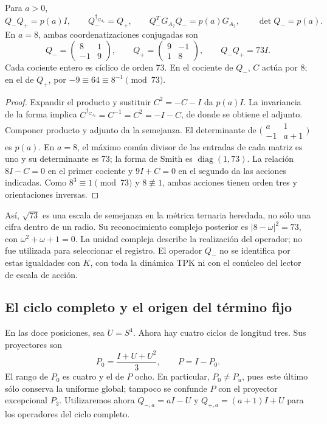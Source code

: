 \begin{proposition}
\label{lib02:norma-A2}
Para \(a>0\),
\[
 Q_-Q_+=p(a)I,\qquad Q_-^{\dagger_{G_{A_2}}}=Q_+,
 \qquad Q_-^TG_{A_2}Q_-=p(a)G_{A_2},\qquad \det Q_-=p(a).
\]
En \(a=8\), ambas coordenatizaciones conjugadas son
\[
 Q_-=
 \begin{pmatrix}8&1\\-1&9\end{pmatrix},\qquad
 Q_+=\begin{pmatrix}9&-1\\1&8\end{pmatrix},\qquad Q_-Q_+=73I.
\]
Cada cociente entero es cíclico de orden 73. En el cociente de \(Q_-\),
\(C\) actúa por \(8\); en el de \(Q_+\), por
\(-9\equiv64\equiv8^{-1}\pmod{73}\).
\end{proposition}
\begin{proof}
Expandir el producto y sustituir \(C^2=-C-I\) da \(p(a)I\).
La invariancia de la forma implica
\(C^{\dagger_{G_{A_2}}}=C^{-1}=C^2=-I-C\), de donde se obtiene
el adjunto. Componer producto y adjunto da la semejanza. El determinante
de \(\bigl(\begin{smallmatrix}a&1\\-1&a+1\end{smallmatrix}\bigr)\)
es \(p(a)\). En \(a=8\), el máximo común divisor de las entradas
de cada matriz es uno y su determinante es 73; la forma de Smith es
\(\operatorname{diag}(1,73)\). La relación \(8I-C=0\) en el
primer cociente y \(9I+C=0\) en el segundo da las acciones indicadas.
Como \(8^3\equiv1\pmod{73}\) y \(8\not\equiv1\), ambas
acciones tienen orden tres y orientaciones inversas.
\end{proof}

Así, \(\sqrt{73}\) es una escala de semejanza en la métrica ternaria
heredada, no sólo una cifra dentro de un radio. Su reconocimiento complejo
posterior es \(|8-\omega|^2=73\), con
\(\omega^2+\omega+1=0\). La unidad compleja describe la realización
del operador; no fue utilizada para seleccionar el registro. El operador
\(Q_-\) no se identifica por estas igualdades con \(K\), con toda
la dinámica TPK ni con el conúcleo del lector de escala de acción.

\subsection{El ciclo completo y el origen del término fijo}
\label{lib02:ciclo-completo}

En las doce posiciones, sea \(U=S^4\). Ahora hay cuatro ciclos de
longitud tres. Sus proyectores son
\[
 P_0=\frac{I+U+U^2}{3},\qquad P=I-P_0.
\]
El rango de \(P_0\) es cuatro y el de \(P\) ocho. En particular,
\(P_0\ne P_u\), pues este último sólo conserva la uniforme global;
tampoco se confunde \(P\) con el proyector excepcional \(P_3\).
Utilizaremos ahora \(Q_{-,a}=aI-U\) y \(Q_{+,a}=(a+1)I+U\)
para los operadores del ciclo completo.

